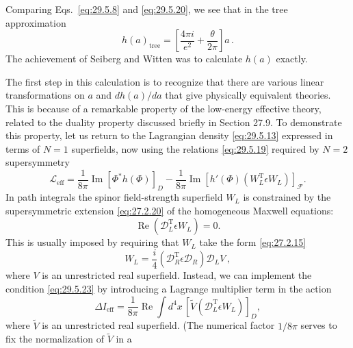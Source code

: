 Comparing Eqs.~\eqref{eq:29.5.8} and \eqref{eq:29.5.20}, we see that in the
tree approximation
\begin{equation}
  h(a)_{\mathrm{tree}}
  =\left[\frac{4\pi i}{e^2}+\frac{\theta}{2\pi}\right]a\,.
  \tag{29.5.21}\label{eq:29.5.21}
\end{equation}
The achievement of Seiberg and Witten was to calculate \(h(a)\) exactly.

The first step in this calculation is to recognize that there are various
linear transformations on \(a\) and \(dh(a)/da\) that give physically
equivalent theories. This is because of a remarkable property of the
low-energy effective theory, related to the duality property discussed
briefly in Section 27.9. To demonstrate this property, let us return to the
Lagrangian density \eqref{eq:29.5.13} expressed in terms of \(N=1\)
superfields, now using the relations \eqref{eq:29.5.19} required by \(N=2\)
supersymmetry
\begin{equation}
  \mathcal{L}_{\mathrm{eff}}
  =\frac{1}{8\pi}\operatorname{Im}\left[\Phi^*h(\Phi)\right]_D
  -\frac{1}{8\pi}\operatorname{Im}
    \left[h'(\Phi)\left(W_L^{\mathrm T}\epsilon W_L\right)\right]_{\mathcal F}.
  \tag{29.5.22}\label{eq:29.5.22}
\end{equation}
In path integrals the spinor field-strength superfield \(W_L\) is constrained
by the supersymmetric extension \eqref{eq:27.2.20} of the homogeneous Maxwell
equations:
\begin{equation}
  \operatorname{Re}\left(\mathcal{D}_L^{\mathrm T}\epsilon W_L\right)=0.
  \tag{29.5.23}\label{eq:29.5.23}
\end{equation}
This is usually imposed by requiring that \(W_L\) take the form
\eqref{eq:27.2.15}
\begin{equation}
  W_L=\frac{i}{4}
  \left(\mathcal{D}_R^{\mathrm T}\epsilon\mathcal{D}_R\right)
  \mathcal{D}_LV\,,
  \tag{29.5.24}\label{eq:29.5.24}
\end{equation}
where \(V\) is an unrestricted real superfield. Instead, we can implement
the condition \eqref{eq:29.5.23} by introducing a Lagrange multiplier term
in the action
\begin{equation}
  \Delta I_{\mathrm{eff}}
  =\frac{1}{8\pi}\operatorname{Re}\int d^4x\,
    \left[
      \widetilde V
      \left(\mathcal{D}_L^{\mathrm T}\epsilon W_L\right)
    \right]_D,
  \tag{29.5.25}\label{eq:29.5.25}
\end{equation}
where \(\widetilde V\) is an unrestricted real superfield. (The numerical
factor \(1/8\pi\) serves to fix the normalization of \(\widetilde V\) in a

